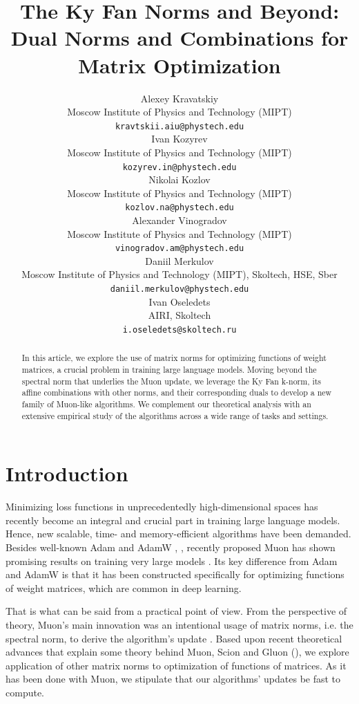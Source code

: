 \documentclass{article} %
\title{The Ky Fan Norms and Beyond: Dual Norms and Combinations for Matrix Optimization}
\author{Alexey Kravatskiy \\
Moscow Institute of Physics and Technology (MIPT) \\
\texttt{kravtskii.aiu@phystech.edu} \\
\And
Ivan Kozyrev \\
Moscow Institute of Physics and Technology (MIPT) \\
\texttt{kozyrev.in@phystech.edu} \\
\And
Nikolai Kozlov \\
Moscow Institute of Physics and Technology (MIPT) \\
\texttt{kozlov.na@phystech.edu} \\
\And
Alexander Vinogradov \\
Moscow Institute of Physics and Technology (MIPT) \\
\texttt{vinogradov.am@phystech.edu} \\
\And
Daniil Merkulov \\
Moscow Institute of Physics and Technology (MIPT), Skoltech, HSE, Sber \\
\texttt{daniil.merkulov@phystech.edu} \\
\And
Ivan Oseledets \\
AIRI, Skoltech \\
\texttt{i.oseledets@skoltech.ru}
}
\begin{document}
\maketitle

\begin{abstract}

In this article, we explore the use of matrix norms for optimizing functions of weight matrices, a crucial problem in training large language models. Moving beyond the spectral norm that underlies the Muon update, we leverage the Ky Fan k-norm, its affine combinations with other norms, and their corresponding duals to develop a new family of Muon-like algorithms. We complement our theoretical analysis with an extensive empirical study of the algorithms across a wide range of tasks and settings.
\end{abstract}


\section{Introduction}
 Minimizing loss functions in unprecedentedly high-dimensional spaces has recently become an integral and crucial part in training large language models. Hence, new scalable, time- and memory-efficient algorithms have been demanded. Besides well-known Adam and AdamW \cite{kingma2014adam}, \cite{loshchilov2017decoupled}, recently proposed Muon has shown promising results on training very large models \cite{jordan2024muon,liu2025muon}. Its key difference from Adam and AdamW is that it has been constructed specifically for optimizing functions of weight matrices, which are common in deep learning.
 
 That is what can be said from a practical point of view. From the perspective of theory, Muon's main innovation was an intentional usage of matrix norms, i.e. the spectral norm, to derive the algorithm's update \cite{bernstein2025deriving}. Based upon recent theoretical advances that explain some theory behind Muon, Scion and Gluon (\cite{bernstein2025deriving,kovalev2025understanding,pethick2025training,riabinin2025gluon}), we explore application of other matrix norms to optimization of functions of matrices. As it has been done with Muon, we stipulate that our algorithms' updates be fast to compute.
\end{document}
